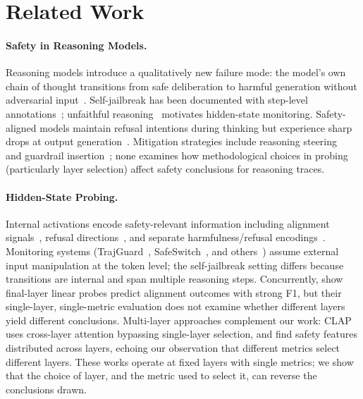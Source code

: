 \section{Related Work}\label{sec:related-work}

\paragraph{Safety in Reasoning Models.}
Reasoning models introduce a qualitatively new failure mode: the model's own chain of thought transitions from safe deliberation to harmful generation without adversarial input~\cite{wang2025lrmsafety}. Self-jailbreak has been documented with step-level annotations~\cite{harmthoughts,selfjailbreak}; unfaithful reasoning~\cite{chen2025unfaithful,turpin2023language} motivates hidden-state monitoring. Safety-aligned models maintain refusal intentions during thinking but experience sharp drops at output generation~\cite{yin2025refusal_cliff,hagendorff2026lrm_jailbreak,hu2026refusal_dynamics,ahrend2026safer_traces}. Mitigation strategies include reasoning steering~\cite{safethink} and guardrail insertion~\cite{mao2025selfjailbreak_reasoning}; none examines how methodological choices in probing (particularly layer selection) affect safety conclusions for reasoning traces.

\paragraph{Hidden-State Probing.}
Internal activations encode safety-relevant information including alignment signals~\cite{zhou2024alignment}, refusal directions~\cite{arditi2024refusal}, and separate harmfulness/refusal encodings~\cite{zhao2025harmfulness,wollschlager2025geometry}. Monitoring systems (TrajGuard~\cite{trajguard}, SafeSwitch~\cite{safeswitch}, and others~\cite{siren,safedream2026,jiang2025hiddendetect,safeint2025,rcs2026,zhou2025ghost}) assume external input manipulation at the token level; the self-jailbreak setting differs because transitions are internal and span multiple reasoning steps. Concurrently, \citet{chan2025probing} show final-layer linear probes predict alignment outcomes with strong F1, but their single-layer, single-metric evaluation does not examine whether different layers yield different conclusions. Multi-layer approaches complement our work: CLAP~\citep{clap2025} uses cross-layer attention bypassing single-layer selection, and \citet{meyoyan2026bertology} find safety features distributed across layers, echoing our observation that different metrics select different layers. These works operate at fixed layers with single metrics; we show that the choice of layer, and the metric used to select it, can reverse the conclusions drawn.


